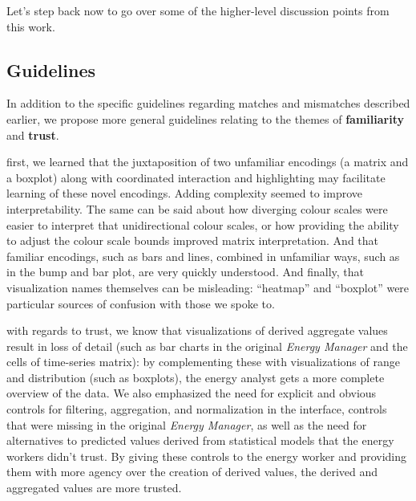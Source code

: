 \documentclass[journal]{vgtc}                %
\newcommand{\bstart}[1]{\vspace{1mm} \noindent{\textbf{#1:}}}
\begin{document}

Let's step back now to go over some of the higher-level discussion points from this work.


\subsection{Guidelines}
\label{discussion-guidelines}


In addition to the specific guidelines regarding matches and mismatches described earlier, we propose more general guidelines relating to the themes of {\bf familiarity} and {\bf trust}.

\bstart{Familiarity} first, we learned that the juxtaposition of two unfamiliar encodings (a matrix and a boxplot) along with coordinated interaction and highlighting may facilitate learning of these novel encodings. 
Adding complexity seemed to improve interpretability. 
The same can be said about how diverging colour scales were easier to interpret that unidirectional colour scales, or how providing the ability to adjust the colour scale bounds improved matrix interpretation.
And that familiar encodings, such as bars and lines, combined in unfamiliar ways, such as in the bump and bar plot, are very quickly understood.
And finally, that visualization names themselves can be misleading: ``heatmap'' and ``boxplot'' were particular sources of confusion with those we spoke to.

\bstart{Trust} with regards to trust, we know that visualizations of derived aggregate values result in loss of detail (such as bar charts in the original {\it Energy Manager} and the cells of time-series matrix): by complementing these with visualizations of range and distribution (such as boxplots), the energy analyst gets a more complete overview of the data.
We also emphasized the need for explicit and obvious controls for filtering, aggregation, and normalization in the interface, controls that were missing in the original {\it Energy Manager}, as well as the need for alternatives to predicted values derived from statistical models that the energy workers didn't trust. 
By giving these controls to the energy worker and providing them with more agency over the creation of derived values, the derived and aggregated values are more trusted. 
\end{document}
